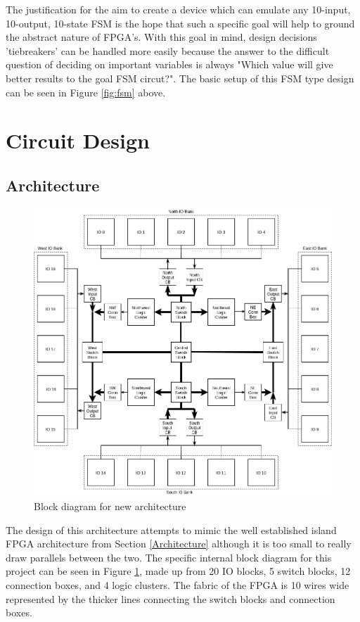 \documentclass[12pt]{article}
\begin{document}
The justification for the aim to create a device which can emulate any 10-input, 10-output,
10-state FSM is the hope that such a specific goal will help to ground the abstract
nature of FPGA's. With this goal in mind, design decisions 'tiebreakers' can be
handled more easily because the answer to the difficult question of deciding on important
variables is always "Which value will give better results to the goal FSM circut?".
The basic setup of this FSM type design can be seen in Figure \ref{fig:fsm} above.

\newpage
\section{Circuit Design}

\subsection{Architecture}

\begin{figure}[htb]
  \centering
  \includegraphics[width=.9\textwidth]{internal_block}
  \caption{Block diagram for new architecture}
  \label{fig:internal_block}
\end{figure}

The design of this architecture attempts to mimic the well established island FPGA 
architecture from Section \ref{Architecture} although it is too small to really draw parallels between the two.
The specific internal block diagram for this project can be seen in Figure \ref{fig:internal_block},
made up from 20 IO blocks, 5 switch blocks, 12 connection boxes, and 4 logic clusters.
The fabric of the FPGA is 10 wires wide represented
by the thicker lines connecting the switch blocks and connection boxes.
\end{document}
